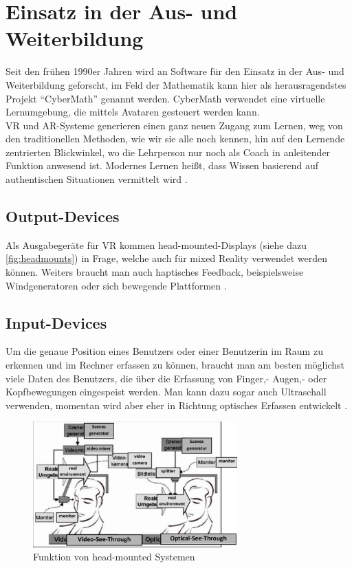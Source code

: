 \documentclass[deutsch]{llncs}
\begin{document}
\section{Einsatz in der Aus- und Weiterbildung}
Seit den frühen 1990er Jahren wird an Software für den Einsatz in der Aus- und Weiterbildung geforscht, im Feld der Mathematik kann hier als herausragendstes Projekt ``CyberMath'' genannt werden. CyberMath verwendet eine virtuelle Lernumgebung, die mittels Avataren gesteuert werden kann. \\
VR und AR-Systeme generieren einen ganz neuen Zugang zum Lernen, weg von den traditionellen Methoden, wie wir sie alle noch kennen, hin auf den Lernende zentrierten Blickwinkel, wo die Lehrperson nur noch als Coach in anleitender Funktion anwesend ist. Modernes Lernen heißt, dass Wissen basierend auf authentischen Situationen vermittelt wird \cite{Klampfer}.
\cite{unknown}
\subsection{Output-Devices}
Als Ausgabegeräte für VR kommen head-mounted-Displays (siehe dazu \autoref{fig:headmounts}) in Frage, welche auch für mixed Reality verwendet werden können. Weiters braucht man auch haptisches Feedback, beispielsweise Windgeneratoren oder sich bewegende Plattformen \cite{Klampfer}.
\subsection{Input-Devices}
Um die genaue Position eines Benutzers oder einer Benutzerin im Raum zu erkennen und im Rechner erfassen zu können, braucht man am besten möglichst viele Daten des Benutzers, die über die Erfassung von Finger,- Augen,- oder Kopfbewegungen eingespeist werden. Man kann dazu sogar auch Ultraschall verwenden, momentan wird aber eher in Richtung optisches Erfassen entwickelt \cite{Klampfer}. 
\begin{figure}[h]
	\centering
	\includegraphics[width=0.7\textwidth]{figures/headmounts}
	\caption{Funktion von head-mounted Systemen}
	\label{fig:headmounts}
\end{figure}
\end{document}
